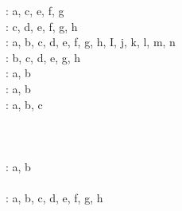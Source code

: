 \documentclass[12pt]{article}
\begin{document}
: a, c, e, f, g \\


: c, d, e, f, g, h \\


: a, b, c, d, e, f, g, h, I, j, k, l, m, n \\


: b, c, d, e, g, h \\


: a, b \\


: a, b \\


: a, b, c \\


 \\


 \\

 \\

: a, b \\

 \\

: a, b, c, d, e, f, g, h \\

 \\

 \\
\end{document}
